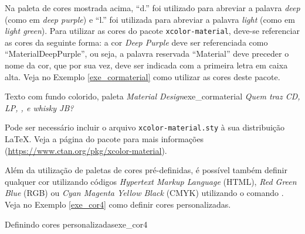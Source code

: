 Na paleta de cores mostrada acima, ``d.'' foi utilizado para abreviar a palavra \textit{deep} (como em \textit{deep purple}) e ``l.'' foi utilizada para abreviar a palavra \textit{light} (como em \textit{light green}). Para utilizar as cores do pacote {\tt xcolor-material}, deve-se referenciar as cores da seguinte forma: a cor \textit{Deep Purple} deve ser referenciada como ``MaterialDeepPurple'', ou seja, a palavra reservada ``Material'' deve preceder o nome da cor, que por sua vez, deve ser indicada com a primeira letra em caixa alta. Veja no Exemplo \ref{exe_cormaterial} como utilizar as cores deste pacote.

\begin{texexptitled}[breakable,center lower,enhanced,middle=2mm]{Texto com fundo colorido, paleta \textit{Material Design}}{exe_cormaterial}
\textit{\colorbox{MaterialRed}{Quem} \colorbox{MaterialPink}{traz} \colorbox{MaterialPurple}{CD}, \colorbox{MaterialDeepPurple}{LP}, \colorbox{MaterialIndigo}{\color{white}{fax}}, \colorbox{MaterialLightBlue}{\color{white}{engov}} \colorbox{MaterialTeal}{e} \colorbox{MaterialGreen}{whisky} \colorbox{MaterialLightGreen}{JB?}}
\end{texexptitled}

\begin{marker}
Pode ser necessário incluir o arquivo {\tt xcolor-material.sty} à sua distribuição \LaTeX{}. Veja a página do pacote para mais informações (\url{https://www.ctan.org/pkg/xcolor-material}).
\end{marker}

Além da utilização de paletas de cores pré-definidas, é possível também definir qualquer cor utilizando códigos \textit{Hypertext Markup Language} (HTML), \textit{Red Green Blue} (RGB) ou \textit{Cyan Magenta Yellow Black} (CMYK) utilizando o comando \texttt{\definecolor}. Veja no Exemplo \ref{exe_cor4} como definir cores personalizadas.

\begin{texexptitled}[breakable,center lower,enhanced,middle=2mm]{Definindo cores personalizadas}{exe_cor4}

\end{texexptitled}

